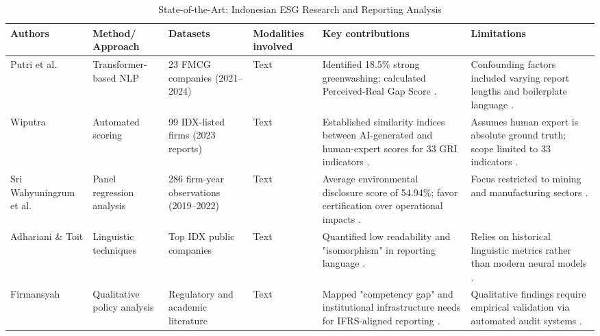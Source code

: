 \begin{landscape}
\begin{table}[p]
\centering
\caption{State-of-the-Art: Indonesian ESG Research and Reporting Analysis}
\label{tab:indonesian-esg-research-reporting-analysis}
\small
\renewcommand{\arraystretch}{1.2}
\begin{tabularx}{\linewidth}{|p{2.5cm}|p{2cm}|p{3cm}|p{1.8cm}|X|X|}
\hline
Authors & Method/ Approach & Datasets & Modalities involved & Key contributions & Limitations \\ \hline
Putri et al.  \parencite{anisa_kusuma_putri_4109a23b} & Transformer-based NLP & 23 FMCG companies (2021–2024) & Text & Identified 18.5\% strong greenwashing; calculated Perceived-Real Gap Score  \parencite{anisa_kusuma_putri_4109a23b}. & Confounding factors included varying report lengths and boilerplate language  \parencite{anisa_kusuma_putri_4109a23b}. \\ \hline
Wiputra  \parencite{richard_wiputra_699f6060} & Automated scoring & 99 IDX-listed firms (2023 reports) & Text & Established similarity indices between AI-generated and human-expert scores for 33 GRI indicators  \parencite{richard_wiputra_699f6060}. & Assumes human expert is absolute ground truth; scope limited to 33 indicators  \parencite{richard_wiputra_699f6060}. \\ \hline
Sri Wahyuningrum et al.  \parencite{indah_fajarini_sri_wahyuningrum_1ce983fb} & Panel regression analysis & 286 firm-year observations (2019–2022) & Text & Average environmental disclosure score of 54.94\%; favor certification over operational impacts  \parencite{indah_fajarini_sri_wahyuningrum_1ce983fb}. & Focus restricted to mining and manufacturing sectors  \parencite{indah_fajarini_sri_wahyuningrum_1ce983fb}. \\ \hline
Adhariani \& Toit  \parencite{desi_adhariani_toit_543335d6} & Linguistic techniques & Top IDX public companies & Text & Quantified low readability and "isomorphism" in reporting language  \parencite{desi_adhariani_toit_543335d6}. & Relies on historical linguistic metrics rather than modern neural models  \parencite{desi_adhariani_toit_543335d6}. \\ \hline
Firmansyah  \parencite{amrie_firmansyah_fd5249a2} & Qualitative policy analysis & Regulatory and academic literature & Text & Mapped "competency gap" and institutional infrastructure needs for IFRS-aligned reporting  \parencite{amrie_firmansyah_fd5249a2}. & Qualitative findings require empirical validation via automated audit systems  \parencite{amrie_firmansyah_fd5249a2}. \\ \hline

\end{tabularx}
\end{table}
\end{landscape}
